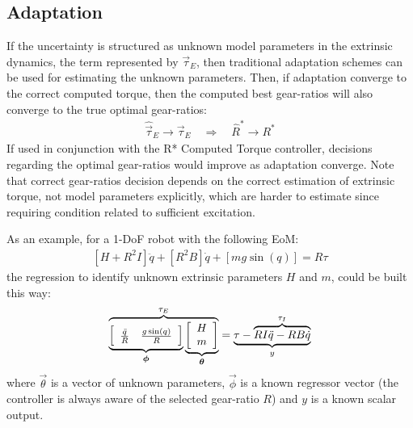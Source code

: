 \subsection{Adaptation}
If the uncertainty is structured as unknown model parameters in the extrinsic dynamics, the term represented by $\vec{\tau}_E$, then traditional adaptation schemes can be used for estimating the unknown parameters. Then, if adaptation converge to the correct computed torque, then the computed best gear-ratios will also converge to the true optimal gear-ratios:
%
\begin{align}
	\hat{\vec{\tau}}_E \rightarrow \vec{\tau}_E 
    \quad \Rightarrow \quad 
    \hat{R}^* \rightarrow R^*
 \label{eq:adapt}
\end{align}
%
If used in conjunction with the R* Computed Torque controller, decisions regarding the optimal gear-ratios would improve as adaptation converge. Note that correct gear-ratios decision depends on the correct estimation of extrinsic torque, not model parameters explicitly, which are harder to estimate since requiring condition related to sufficient excitation. 

As an example, for a 1-DoF robot with the following EoM:
%
\begin{align}
	\left[ H + R^2 I \right] \ddot{q} + \left[ R^2 B \right] \dot{q} + \left[ mg \sin( q ) \right] = R \tau
\end{align}
%
the regression to identify unknown extrinsic parameters $H$ and $m$, could be built this way:
%
%
\begin{align}
	\overbrace{
	\underbrace{ \left[
	\begin{array}{c c}
		\frac{\ddot{q}}{R} &  \frac{ g \sin( q ) }{R}
	\end{array} \right] }_{\vec{\phi}}
	\underbrace{ \left[
	\begin{array}{c}
		H \\ m 
	\end{array} \right] }_{\vec{\theta}}
	}^{\tau_E} = \underbrace{ \tau -  \overbrace{ R I \ddot{q} -  R B \dot{q} }^{\tau_I} }_{y}
\end{align}
%
where $\vec{\theta}$ is a vector of unknown parameters, $\vec{\phi}$ is a known regressor vector (the controller is always aware of the selected gear-ratio $R$) and $y$ is a known scalar output. 

